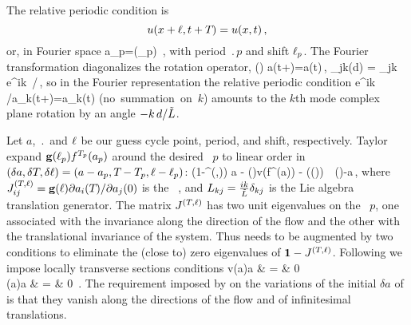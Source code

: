 



The relative periodic condition is
\[
    u(x+\ell,t+{T_{}})=u(x,t)
        \,,
\]
or, in Fourier space
\beq
    a_p=(\shift_p)  
\,,
    \label{eq:RPOcond}
\eeq
with period $\period{p}$ and shift $\ell_p$.
The Fourier transformation diagonalizes the rotation operator,
\beq
    (\shift)  a(t+\period{})=a(t)\,,\qquad
            _{jk}(d) = \delta_{jk} e^{ik\, \shift/\tildeL}\,,
    \label{eq:RPO}
\eeq
so in the Fourier representation the relative periodic condition
\beq
    e^{ik\, \shift /\tildeL}a_k(t+\period{})=a_k(t)  %
    \qquad \mbox{(no summation on $k$)}
    \label{eq:RPOcondition}
\eeq
amounts to the $k$th mode complex plane rotation by an
angle $-k\, d /\tilde{L}$.

Let
$a$, $\period{}$ and $\ell$
be our guess cycle point, period, and shift, respectively.
Taylor expand $\mathbf{g}(\ell_p)  {f^{{T_{p}}}(a_p)}$
around the desired \rpo\ $p$ to linear order in
$(\delta a,\delta {T_{}},\delta \ell)
   =(a-a_p,{T_{}} - {T_{p}},\ell-\ell_p)$:
\beq
    \left({1}-\jMps^{(\period{},\shift)}\right) \delta a
   - (\shift)v(f^{\period{}}(a)) \delta \period{}
                            - ((\shift))\delta \shift
                    \,\simeq\, (\shift)-a\,,
    \label{eq:NewtonBasicCond}
\eeq
where ${J}^{({T_{}},\ell)}_{ij}
  = \mathbf{g}(\ell)\partial a_i({T_{}})/\partial a_j(0)$
is the \rpo\ {\jacobianM}, and
$L_{kj}=\frac{ik}{\tilde{L}}\delta_{kj}$ is the Lie algebra translation
generator.
The matrix ${J}^{({T_{}},\ell)}$
has two unit eigenvalues on the \rpo\ $p$,
one associated with the invariance along
the direction of the flow and the other with the
translational invariance of the system. Thus 
needs to be augmented by two conditions to
eliminate the (close to) zero eigenvalues of
$\mathbf{1}-{J}^{({T_{}},\ell)}$. Following
 we impose locally transverse sections
conditions
\bea
    v(a)\cdot\delta a & = & 0 \label{eq:NewtonAux1} \,\\
    (a)\cdot \delta a & = & 0
\,.
\label{eq:NewtonAux2}
\eea
The requirement imposed by 
on the variations of the initial $\delta a$ of 
is that they   vanish along the directions of the flow
and of infinitesimal translations.


